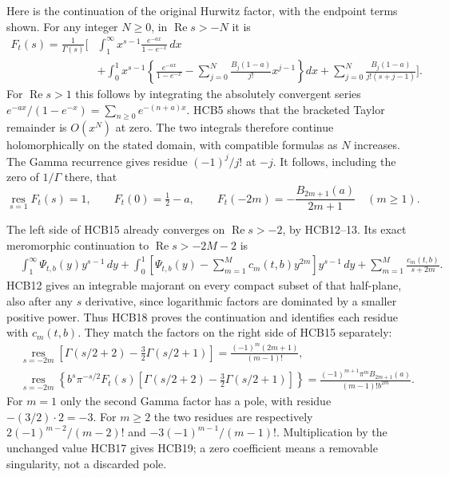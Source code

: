 \documentclass[11pt]{article}
\begin{document}
Here is the continuation of the original Hurwitz factor, with the
endpoint terms shown. For any integer $N\geq0$, in
$\operatorname{Re}s>-N$ it is
\begin{equation}\tag{HCB16}
\begin{split}
 F_t(s)=\frac1{\Gamma(s)}\bigg[&
 \int_1^\infty x^{s-1}\frac{e^{-a x}}{1-e^{-x}}\,dx\\
 &+\int_0^1x^{s-1}\left\{\frac{e^{-a x}}{1-e^{-x}}
             -\sum_{j=0}^N\frac{B_j(1-a)}{j!}x^{j-1}\right\}dx
 +\sum_{j=0}^N\frac{B_j(1-a)}{j!(s+j-1)}\bigg].
\end{split}
\end{equation}
For $\operatorname{Re}s>1$ this follows by integrating the absolutely
convergent series $e^{-a x}/(1-e^{-x})=\sum_{n\geq0}e^{-(n+a)x}$.
HCB5 shows that the bracketed Taylor remainder is $O(x^N)$ at
zero. The two integrals therefore continue holomorphically on the
stated domain, with compatible formulas as $N$ increases.
The Gamma recurrence gives residue $(-1)^j/j!$ at $-j$. It follows,
including the zero of $1/\Gamma$ there, that
\begin{equation}\tag{HCB17}
 \operatorname*{res}_{s=1}F_t(s)=1,\qquad
 F_t(0)=\tfrac12-a,\qquad
 F_t(-2m)=-\frac{B_{2m+1}(a)}{2m+1}\quad(m\geq1).
\end{equation}

The left side of HCB15 already converges on
$\operatorname{Re}s>-2$, by HCB12--13. Its exact meromorphic
continuation to $\operatorname{Re}s>-2M-2$ is
\begin{equation}\tag{HCB18}
\begin{split}
 &\int_1^\infty\Psi_{t,b}(y)y^{s-1}\,dy
 +\int_0^1\left[\Psi_{t,b}(y)-\sum_{m=1}^M c_m(t,b)y^{2m}\right]
                y^{s-1}\,dy
 +\sum_{m=1}^M\frac{c_m(t,b)}{s+2m}.
\end{split}
\end{equation}
HCB12 gives an integrable majorant on every compact subset of that
half-plane, also after any $s$ derivative, since logarithmic factors
are dominated by a smaller positive power. Thus HCB18 proves the
continuation and identifies each residue with $c_m(t,b)$.
They match the factors on the right side of HCB15 separately:
\begin{equation}\tag{HCB19}
\begin{split}
 &\operatorname*{res}_{s=-2m}
 \left[\Gamma(s/2+2)-\frac32\Gamma(s/2+1)\right]
       =\frac{(-1)^m(2m+1)}{(m-1)!},\\
 &\operatorname*{res}_{s=-2m}
 \left\{b^s\pi^{-s/2}F_t(s)
       \left[\Gamma(s/2+2)-\frac32\Gamma(s/2+1)\right]\right\}
       =\frac{(-1)^{m+1}\pi^mB_{2m+1}(a)}{(m-1)!b^{2m}}.
\end{split}
\end{equation}
For $m=1$ only the second Gamma factor has a pole, with residue
$-(3/2)\cdot2=-3$. For $m\geq2$ the two residues are respectively
$2(-1)^{m-2}/(m-2)!$ and $-3(-1)^{m-1}/(m-1)!$.
Multiplication by the unchanged value HCB17 gives HCB19; a zero
coefficient means a removable singularity, not a discarded pole.
\end{document}

